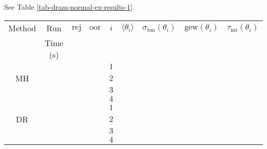 See Table \ref{tab-dram-normal-ex-results-1}.

\begin{table}[h!]
\begin{center}
\begin{tabular}{|c|c|c|c|c|c|c|c|c|}
\hline
Method & Run      & $\text{rej}$           & $\text{oor}$           & $i$ & $\langle\theta_i\rangle$ & $\sigma_{\text{bm}}(\theta_i)$ & $\text{gew}(\theta_i)$ & $\tau_{\text{int}}(\theta_i)$ \\
       & Time (s) &                        &                        &     &                          &                                &                        &                               \\
\hline
\hline
       &          &                        &                        & $1$ &                          &                                &                        &                               \\
\cline{5-9}
MH     &          &                        &                        & $2$ &                          &                                &                        &                               \\
\cline{5-9}
       &          &                        &                        & $3$ &                          &                                &                        &                               \\
\cline{5-9}
       &          &                        &                        & $4$ &                          &                                &                        &                               \\
\hline
\hline
       &          &                        &                        & $1$ &                          &                                &                        &                               \\
\cline{5-9}
DR     &          &                        &                        & $2$ &                          &                                &                        &                               \\
\cline{5-9}
       &          &                        &                        & $3$ &                          &                                &                        &                               \\
\cline{5-9}
       &          &                        &                        & $4$ &                          &                                &                        &                               \\

\end{tabular}
\end{center}
\end{table}
